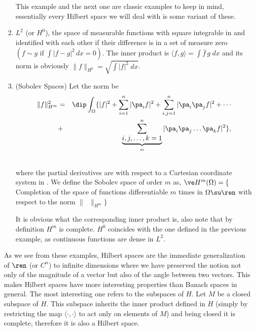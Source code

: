 \begin{enumerate}
This example and the next one are classic examples to keep in mind, essentially every Hilbert space we will deal with is some variant of these.

\item $L^2$ (or $H^0$), the space of measurable functions with square integrable in \re{} and identified with each other if their difference is in a set of measure zero $(f\sim g \mbox{ if }\int |f-g|^2\,dx=0)$. The inner product is $\langle f,g\rangle=\int \bar f \,g\;dx$ and its norm is obviously $\|f\|_{H^0}=\sqrt{\int |f|^2\;dx}$.

\item (Sobolev Spaces)
Let the norm be
\begin{eqnarray*} 
\|f\|^2_{H^m} &=&  \dip\int_{\Omega}\{|f|^2+\sum^n_{i=1}|\pa_i
f|^2+\sum^n_{i,j=1}|\pa_i\pa_jf|^2+\cdots \\
&+&\sum_
{\underbrace{i,j,\ldots,k=1}_m}^n|\pa_i\pa_j\ldots\pa_k f|^2\}, \nonumber \\
\;
\end{eqnarray*}
%
where the partial derivatives are with respect to a Cartesian coordinate system in \ren. We define the Sobolev space of order $m$ as,
$\ve H^m(\Omega)=\{$ Completion of the space of functions differentiable $m$ times in $\Omega\su\ren$ with respect to the norm $\|\;\;\|_{H^m}\}$

It is obvious what the corresponding inner product is, also note that by definition $H^m$ is complete. $H^0$ coincides with the one defined in the previous example, as continuous functions are dense in $L^2$.

\end{enumerate}

As we see from these examples, Hilbert spaces are the immediate generalization of $\ren $ (or $C^n$) to infinite dimensions where we have preserved the notion not only of the magnitude of a vector but also of the angle between two vectors.
This makes Hilbert spaces have more interesting properties than Banach spaces in general. The most interesting one refers to the subspaces of $H$. Let $M$ be a closed subspace of $H$. This subspace inherits the inner product defined in $H$ 
(simply by restricting the map $\langle\cdot ,\cdot \rangle$ to act only on elements of $M$) and being closed it is complete, therefore it is also a Hilbert space.
\espa

